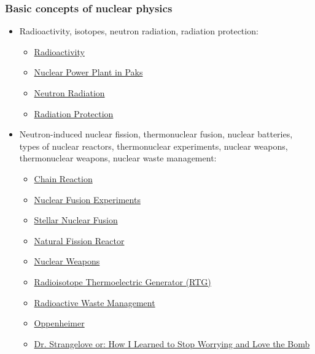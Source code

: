 \documentclass[t,aspectratio=169,xcolor=dvipsnames]{beamer}
\begin{document}
\begin{frame}
\frametitle{Basic concepts of nuclear physics}
\begin{itemize}
\setlength{\parskip}{0pt}
\setlength{\itemsep}{0pt}
\item Radioactivity, isotopes, neutron radiation, radiation protection:
  \begin{itemize}
  \item \href{https://www.cea.fr/english/Documents/thematic-publications/radioactivity.pdf}{Radioactivity}
  \item \href{https://atomeromu.mvm.hu/en/Tudastar/HogyanMukodik}{Nuclear Power Plant in Paks}
  \item \href{https://en.wikipedia.org/wiki/Neutron_radiation}{Neutron Radiation}
  \item \href{https://en.wikipedia.org/wiki/Radiation_protection}{Radiation Protection}
\end{itemize}
\item Neutron-induced nuclear fission, thermonuclear fusion, nuclear batteries, types of nuclear reactors, thermonuclear experiments, nuclear weapons, thermonuclear weapons, nuclear waste management:
  \begin{itemize}
  \item \href{https://www.atomicarchive.com/science/fission/chain-reactions.html}{Chain Reaction}
  \item \href{https://world-nuclear.org/information-library/current-and-future-generation/nuclear-fusion-power}{Nuclear Fusion Experiments}
  \item \href{https://www.britannica.com/science/nuclear-fusion/Fusion-reactions-in-stars}{Stellar Nuclear Fusion}
  \item \href{https://www.researchgate.net/publication/242879324_The_last_natural_nuclear_fission_reactor}{Natural Fission Reactor}
  \item \href{https://www.britannica.com/technology/nuclear-weapon}{Nuclear Weapons}
  \item \href{https://science.nasa.gov/planetary-science/programs/radioisotope-power-systems/overview/}{Radioisotope Thermoelectric Generator (RTG)}

  \pagebreak
  \item \href{https://world-nuclear.org/information-library/nuclear-fuel-cycle/nuclear-waste/radioactive-waste-management}{Radioactive Waste Management}
  \item \href{https://www.imdb.com/title/tt15398776/}{Oppenheimer}
  \item \href{https://www.imdb.com/title/tt0057012/}{Dr. Strangelove or: How I Learned to Stop Worrying and Love the Bomb}
  \end{itemize}
  

\end{itemize}
\end{frame}
\end{document}
